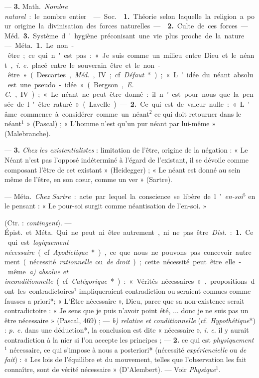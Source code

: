 \begin{itemize}[leftmargin=1cm, label=, itemsep=1pt]
— {\bf 3.} \si{Math.} {\it Nombre naturel} : le nombre entier.

 — \si{Soc.}  {\bf 1.} Théorie selon laquelle la
religion a pour origine la divinisation des forces naturelles. —  {\bf 2.} Culte de ces forces.

— \si{Méd.} {\bf 3.} Système d'hygiène préconisant une vie plus proche de
la nature.

 — \si{Méta.} {\bf 1.} Le non-être ; ce qui n'est pas : « Je suis
comme un milieu
entre Dieu et le néant, {\it i. e.} placé entre le souverain être et le
non-être » (Descartes, {\it Méd.}, IV ; cf. {\it Défaut}*) ; « L'idée du
néant absolu est une pseudo-idée » (Bergson, {\it E. C.}, IV) ; « Le néant ne
peut être donné : il n’est pour nous que la pensée de l'être
raturé » (Lavelle). —  {\bf 2.} Ce qui est de valeur nulle : « L'âme commence
à considérer comme un néant$^2$ ce qui doit retourner dans le
néant$^1$ » (Pascal) ; « L'homme n’est qu'un pur néant par
lui-même » (Malebranche).

— {\bf 3.} {\it Chez les existentialistes} : limitation de l'être, origine de
la négation : « Le Néant n'est pas l'opposé indéterminé à l'égard de
l'existant, il se dévoile comme composant l'être de cet
existant » (Heidegger) ; « Le néant est donné au sein même de l'être, en son
cœur, comme un ver » (Sartre).

 — \si{Méta.} {\it Chez Sartre} : acte par lequel la
conscience se libère de l’{\it en-soi}$^5$ en le pensant : « Le pour-soi
surgit comme néantisation de l'en-soi. »

 (Ctr. : {\it contingent}). — \si{Épist.} et \si{Méta.} Qui ne
peut ni être autrement, ni ne pas être. {\it Dist.} : {\bf 1.} Ce qui est
{\it logiquement nécessaire} (cf. {\it Apodictique}*), ce que nous ne pouvons
pas concevoir autrement (nécessité {\it rationnelle} ou {\it de droit}) ;
cette nécessité peut être elle-même {\it a) absolue et inconditionnelle} (cf.
{\it Catégorique}*) : « Vérités nécessaires », propositions dont les
contradictoires$^1$ impliqueraient contradiction ou seraient connues comme
fausses a priori*; « L'Être nécessaire », Dieu, parce que sa non-existence
serait contradictoire : « Je sens que je puis n’avoir point été, ... donc je
ne suis pas un être nécessaire » (Pascal, 469) ; — {\it b) relative et
conditionnelle}
(cf. {\it Hypothétique}*) : {\it p. e.} dans une déduction*, la conclusion
est dite « nécessaire », {\it i. e.} il y aurait contradiction à la nier si
l’on accepte les principes ; — {\bf 2.} ce qui est {\it physiquement}$^1$
nécessaire, ce qui s'impose à nous a posteriori* (nécessité
{\it expériencielle} ou {\it de fait}) : « Les lois de l'équilibre et du
mouvement, telles que l'observation les fait connaître, sont de vérité
nécessaire » (D’Alembert). — Voir {\it Physique}$^1$.


\end{itemize}
